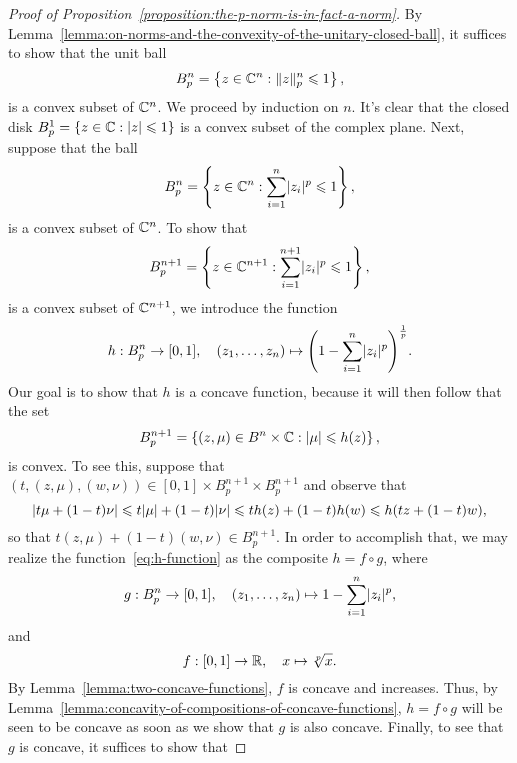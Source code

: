\begin{proof}[Proof of Proposition~\ref{proposition:the-p-norm-is-in-fact-a-norm}]
  By Lemma~\ref{lemma:on-norms-and-the-convexity-of-the-unitary-closed-ball},
  it suffices to show that the unit ball
  \[
    B^{n}_{p}
    =
    \left\{z\in\complexfield^{n}:\norm<n>[p](z)\leqslant{1}\right\},
  \]
  is a convex subset of \(\mathbb{C}^{n}\). We proceed by induction on
  \(n\). It's clear that the closed disk
  \(B^{1}_{p}=\left\{z\in\mathbb{C}:\lvert z\rvert\leqslant{1}\right\}\) is a
  convex subset of the complex plane. Next, suppose that the ball
  \[
    B^{n}_{p}
    =
    \left\{z\in\mathbb{C}^{n}:\sum_{i=1}^{n}\lvert z_{i}\rvert^{p}\leqslant{1}\right\},
  \]
  is a convex subset of \(\mathbb{C}^{n}\). To show that
  \[
    B^{n+1}_{p}
    =
    \left\{z\in\mathbb{C}^{n+1}:\sum_{i=1}^{n+1}\lvert z_{i}\rvert^{p}\leqslant{1}\right\},
  \]
  is a convex subset of \(\mathbb{C}^{n+1}\), we introduce the function
  \begin{equation}\label{eq:h-function}
    h:B^{n}_{p}\to{[0,1]},
    \quad{(z_{1},\ldots,z_{n})\mapsto\left(1-\sum_{i=1}^{n}\lvert z_{i}\rvert^{p}\right)^{\frac{1}{p}}}.
  \end{equation}
  Our goal is to show that \(h\) is a concave function, because it will then follow that
  the set
  \[
    B^{n+1}_{p}
    =
    \left\{(z,\mu)\in{B^{n}\times\mathbb{C}}:\lvert\mu\rvert\leqslant{h(z)}\right\},
  \]
  is convex. To see this, suppose that
  \((t,(z,\mu),(w,\nu))\in{[0,1]\times{B^{n+1}_{p}}\times{B^{n+1}_{p}}}\) and
  observe that
  \[
    \lvert t\mu+(1-t)\nu\rvert
    \leqslant{t\lvert\mu\rvert+(1-t)\lvert\nu\rvert}
    \leqslant{th(z)+(1-t)h(w)}
    \leqslant{h(tz+(1-t)w}),
  \]
  so that \(t(z,\mu)+(1-t)(w,\nu)\in{B^{n+1}_{p}}\). In order to accomplish
  that, we may realize the function~\eqref{eq:h-function} as the composite
  \(h=f\circ{g}\), where
  \begin{equation}\label{eq:g-function}
    g:B^{n}_{p}\to[0,1],
    \quad{(z_{1},\ldots,z_{n})\mapsto{1-\sum_{i=1}^{n}\lvert z_{i}\rvert^{p}}},
  \end{equation}
  and
  \begin{equation}\label{eq:f-function}
    f:[0,1]\to\mathbb{R},\quad{x\mapsto{\sqrt[p]{x}}}.
  \end{equation}
  By Lemma~\ref{lemma:two-concave-functions}, \(f\) is concave and increases.
  Thus, by Lemma~\ref{lemma:concavity-of-compositions-of-concave-functions},
  \(h=f\circ{g}\) will be seen to be concave as soon as we show that \(g\) is
  also concave. Finally, to see that \(g\) is concave, it suffices to show that

\end{proof}
